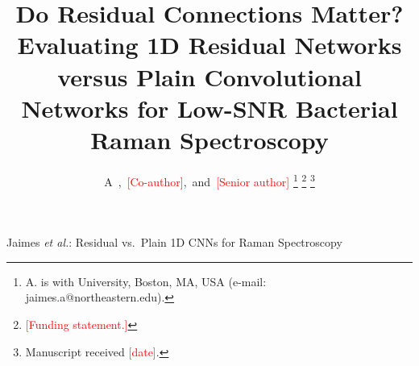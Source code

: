 \documentclass[journal,onecolumn]{IEEEtran}
\newcommand{\TBD}[1]{\textcolor{red}{[#1]}}
\newcommand{\NOTE}[1]{\textcolor{blue}{\textit{[Note: #1]}}}
\begin{document}
\title{Do Residual Connections Matter? Evaluating 1D Residual Networks
versus Plain Convolutional Networks for Low-SNR Bacterial Raman Spectroscopy}

\author{A~,~\TBD{Co-author},~and~\TBD{Senior author}%
\thanks{A.  is with University, Boston, MA, USA
(e-mail: jaimes.a@northeastern.edu).}%
\thanks{\TBD{Funding statement.}}%
\thanks{Manuscript received \TBD{date}.}}

%
{Jaimes \MakeLowercase{\textit{et al.}}: Residual vs.\ Plain 1D CNNs for Raman Spectroscopy}

\maketitle
\end{document}
